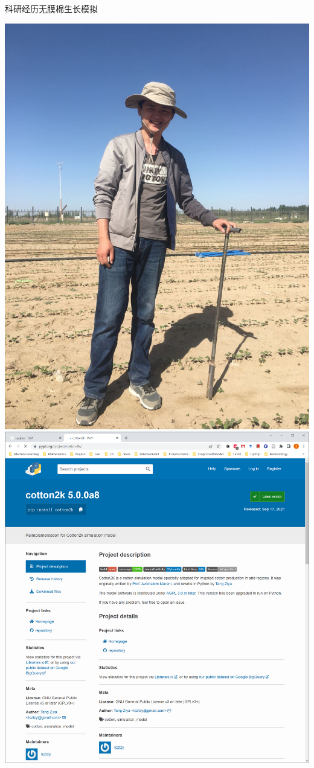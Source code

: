 \documentclass[xcolor=svgnames, t, aspectratio=169]{ctexbeamer}
\begin{document}
\begin{frame}{科研经历}{无膜棉生长模拟}
  \begin{center}
    \includegraphics[scale=0.11, angle=270, origin=c]{field.jpg}
    \includegraphics[scale=0.16]{cotton2kpypi.png}
  \end{center}
\end{frame}
\end{document}
